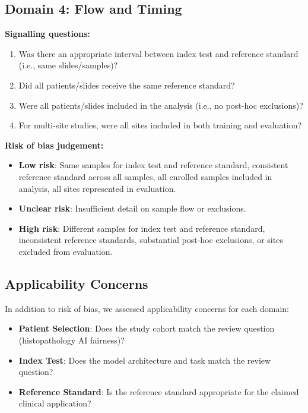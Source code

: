 \subsection*{Domain 4: Flow and Timing}

\textbf{Signalling questions:}
\begin{enumerate}
  \item Was there an appropriate interval between index test and reference standard (i.e., same slides/samples)?
  \item Did all patients/slides receive the same reference standard?
  \item Were all patients/slides included in the analysis (i.e., no post-hoc exclusions)?
  \item For multi-site studies, were all sites included in both training and evaluation?
\end{enumerate}

\textbf{Risk of bias judgement:}
\begin{itemize}
  \item \textbf{Low risk}: Same samples for index test and reference standard, consistent reference standard across all samples, all enrolled samples included in analysis, all sites represented in evaluation.
  \item \textbf{Unclear risk}: Insufficient detail on sample flow or exclusions.
  \item \textbf{High risk}: Different samples for index test and reference standard, inconsistent reference standards, substantial post-hoc exclusions, or sites excluded from evaluation.
\end{itemize}

\subsection*{Applicability Concerns}

In addition to risk of bias, we assessed applicability concerns for each domain:

\begin{itemize}
  \item \textbf{Patient Selection}: Does the study cohort match the review question (histopathology AI fairness)?
  \item \textbf{Index Test}: Does the model architecture and task match the review question?
  \item \textbf{Reference Standard}: Is the reference standard appropriate for the claimed clinical application?
\end{itemize}

